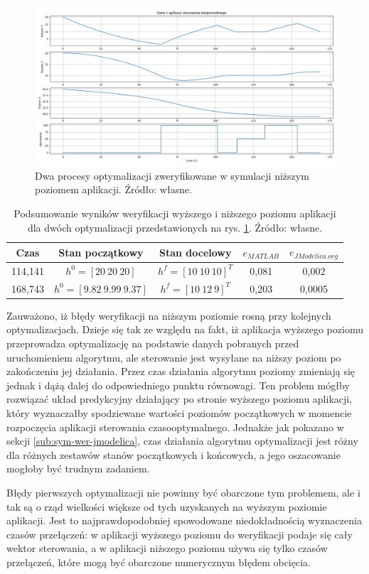\begin{figure}
    \centering
    \includegraphics[scale=0.5,angle=90]{Grafika/ext_ctrl_2_opts}
    \caption{Dwa procesy optymalizacji zweryfikowane w symulacji niższym poziomem aplikacji. Źródło: własne.}
    \label{fig:extctrl2opts}
\end{figure}

\begin{table}[htp]
    \centering
    \begin{tabular}{|c|c|c|c|c|}
        \hline 
        \textbf{Czas} & \textbf{Stan początkowy} & \textbf{Stan docelowy} & \textbf{$e_{MATLAB}$} & \textbf{$e_{JModelica.org}$} \\
        \hline 
        114,141 & $h^{0} = [20~ 20~ 20]$ & $h^{f} = [10 ~10~ 10]^{T}$ & 0,081 & 0,002 \\ 
        \hline 
        168,743 & $h^{0} = [9.82~ 9.99~ 9.37]$ & $h^{f} = [10 ~12~ 9]^{T}$ & 0,203 & 0,0005 \\ 
        \hline 
    \end{tabular}
    \caption{Podsumowanie wyników weryfikacji wyższego i niższego poziomu aplikacji dla dwóch optymalizacji przedstawionych na rys. \ref{fig:extctrl2opts}. Źródło: własne.}
    \label{tab:extctrl2opts}
\end{table}

Zauważono, iż błędy weryfikacji na niższym poziomie rosną przy kolejnych optymalizacjach. Dzieje się tak ze względu na fakt, iż aplikacja wyższego poziomu przeprowadza optymalizację na podstawie danych pobranych przed uruchomieniem algorytmu, ale sterowanie jest wysyłane na niższy poziom po zakończeniu jej działania. Przez czas działania algorytmu poziomy zmieniają się jednak i dążą dalej do odpowiedniego punktu równowagi. Ten problem mógłby rozwiązać układ predykcyjny działający po stronie wyższego poziomu aplikacji, który wyznaczałby spodziewane wartości poziomów początkowych w momencie rozpoczęcia aplikacji sterowania czasooptymalnego. Jednakże jak pokazano w sekcji \ref{sub:sym-wer-jmodelica}, czas działania algorytmu optymalizacji jest różny dla różnych zestawów stanów początkowych i końcowych, a jego oszacowanie mogłoby być trudnym zadaniem.

Błędy pierwszych optymalizacji nie powinny być obarczone tym problemem, ale i tak są o rząd wielkości większe od tych uzyskanych na wyższym poziomie aplikacji. Jest to najprawdopodobniej spowodowane niedokładnością wyznaczenia czasów przełączeń: w aplikacji wyższego poziomu do weryfikacji podaje się cały wektor sterowania, a w aplikacji niższego poziomu używa się tylko czasów przełączeń, które mogą być obarczone numerycznym błędem obcięcia.
